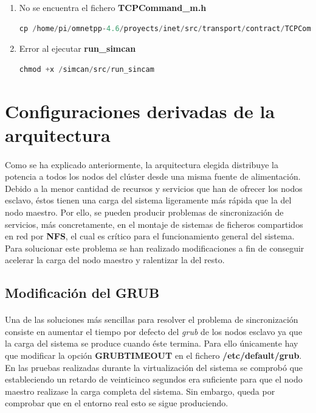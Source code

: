 \begin{enumerate}

\item No se encuentra el fichero \textbf{TCPCommand\_m.h}
\begin{lstlisting}[language=c,frame=single,numbers=none]
	cp /home/pi/omnetpp-4.6/proyects/inet/src/transport/contract/TCPCommand_m.h /home/pi/omnetpp-4.6/proyects/simcan/src/Messages/TCPCommand_m.h
\end{lstlisting}

\item Error al ejecutar \textbf{run\_simcan}

\begin{lstlisting}[language=c,frame=single,numbers=none]
	chmod +x /simcan/src/run_sincam
\end{lstlisting}

\end{enumerate}


\section{Configuraciones derivadas de la arquitectura}
\label{makereference3.7}
\paragraph{}

Como se ha explicado anteriormente, la arquitectura elegida distribuye la potencia a todos los nodos del clúster desde una misma fuente de alimentación. Debido a la menor cantidad de recursos y servicios que han de ofrecer los nodos esclavo, éstos tienen una carga del sistema ligeramente más rápida que la del nodo maestro. Por ello, se pueden producir problemas de sincronización de servicios, más concretamente, en el montaje de sistemas de ficheros compartidos en red por \textbf{NFS}, el cual es crítico para el funcionamiento general del sistema. Para solucionar este problema se han realizado modificaciones a fin de conseguir acelerar la carga del nodo maestro y ralentizar la del resto.

\subsection{Modificación del GRUB}
\paragraph{}

Una de las soluciones más sencillas para resolver el problema de sincronización consiste en aumentar el tiempo por defecto del \textit{grub} de los nodos esclavo ya que la carga del sistema se produce cuando éste termina. Para ello únicamente hay que modificar la opción \textbf{GRUBTIMEOUT} en el fichero \textbf{/etc/default/grub}. 
En las pruebas realizadas durante la virtualización del sistema se comprobó que estableciendo un retardo de veinticinco segundos era suficiente para que el nodo maestro realizase la carga completa del sistema. Sin embargo, queda por comprobar que en el entorno real esto se sigue produciendo.

